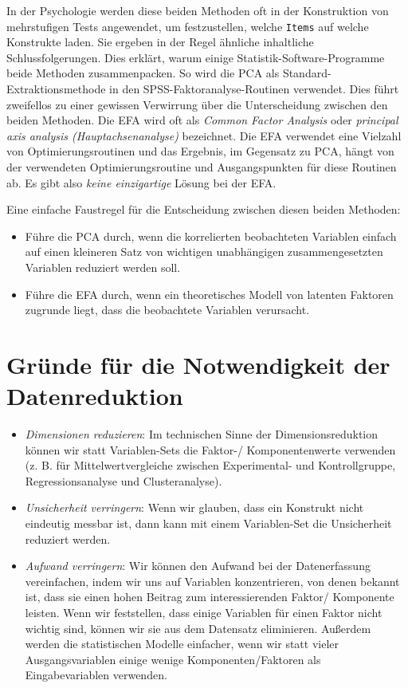 \documentclass[12pt,ngerman,]{book}
\providecommand{\tightlist}{%
  \setlength{\itemsep}{0pt}\setlength{\parskip}{0pt}}
\theoremstyle{definition}
\theoremstyle{definition}
\theoremstyle{remark}
\begin{document}
In der Psychologie werden diese beiden Methoden oft in der Konstruktion
von mehrstufigen Tests angewendet, um festzustellen, welche
\texttt{Items} auf welche Konstrukte laden. Sie ergeben in der Regel
ähnliche inhaltliche Schlussfolgerungen. Dies erklärt, warum einige
Statistik-Software-Programme beide Methoden zusammenpacken. So wird die
PCA als Standard-Extraktionsmethode in den SPSS-Faktoranalyse-Routinen
verwendet. Dies führt zweifellos zu einer gewissen Verwirrung über die
Unterscheidung zwischen den beiden Methoden. Die EFA wird oft als
\emph{Common Factor Analysis} oder \emph{principal axis analysis
(Hauptachsenanalyse)} bezeichnet. Die EFA
verwendet eine Vielzahl von Optimierungsroutinen und das Ergebnis, im
Gegensatz zu PCA, hängt von der verwendeten Optimierungsroutine und
Ausgangspunkten für diese Routinen ab. Es gibt also \emph{keine
einzigartige} Lösung bei der EFA.

Eine einfache Faustregel für die Entscheidung zwischen diesen beiden
Methoden:

\begin{itemize}
\tightlist
\item
  Führe die PCA durch, wenn die korrelierten beobachteten Variablen
  einfach auf einen kleineren Satz von wichtigen unabhängigen
  zusammengesetzten Variablen reduziert werden soll.
\item
  Führe die EFA durch, wenn ein theoretisches Modell von latenten
  Faktoren zugrunde liegt, dass die beobachtete Variablen verursacht.
\end{itemize}

\section{Gründe für die Notwendigkeit der
Datenreduktion}\label{grunde-fur-die-notwendigkeit-der-datenreduktion}

\begin{itemize}
\tightlist
\item
  \emph{Dimensionen reduzieren}: Im technischen Sinne der
  Dimensionsreduktion können wir statt Variablen-Sets die Faktor-/
  Komponentenwerte verwenden (z. B. für Mittelwertvergleiche zwischen
  Experimental- und Kontrollgruppe, Regressionsanalyse und
  Clusteranalyse).
\item
  \emph{Unsicherheit verringern}: Wenn wir glauben, dass ein Konstrukt
  nicht eindeutig messbar ist, dann kann mit einem Variablen-Set die
  Unsicherheit reduziert werden.
\item
  \emph{Aufwand verringern}: Wir können den Aufwand bei der
  Datenerfassung vereinfachen, indem wir uns auf Variablen
  konzentrieren, von denen bekannt ist, dass sie einen hohen Beitrag zum
  interessierenden Faktor/ Komponente leisten. Wenn wir feststellen,
  dass einige Variablen für einen Faktor nicht wichtig sind, können wir
  sie aus dem Datensatz eliminieren. Außerdem werden die statistischen
  Modelle einfacher, wenn wir statt vieler Ausgangsvariablen einige
  wenige Komponenten/Faktoren als Eingabevariablen verwenden.
\end{itemize}
\end{document}
